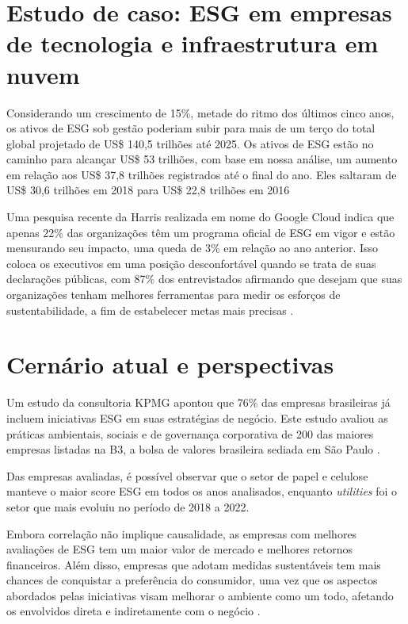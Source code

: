 \documentclass[12pt]{article}
\begin{document}
	\section*{Estudo de caso: ESG em empresas de tecnologia e infraestrutura em nuvem}
	
	Considerando um crescimento de 15\%, metade do ritmo dos últimos cinco anos, os ativos de ESG sob gestão poderiam subir para mais de um terço do total global projetado de US\$ 140,5 trilhões até 2025. Os ativos de ESG estão no caminho para alcançar US\$ 53 trilhões, com base em nossa análise, um aumento em relação aos US\$ 37,8 trilhões registrados até o final do ano. Eles saltaram de US\$ 30,6 trilhões em 2018 para US\$ 22,8 trilhões em 2016 \cite{bloombergprofessionalservicesESGAssetsMay2021}
	
	Uma pesquisa recente da Harris realizada em nome do Google Cloud indica que apenas 22\% das organizações têm um programa oficial de ESG em vigor e estão mensurando seu impacto, uma queda de 3\% em relação ao ano anterior. Isso coloca os executivos em uma posição desconfortável quando se trata de suas declarações públicas, com 87\% dos entrevistados afirmando que desejam que suas organizações tenham melhores ferramentas para medir os esforços de sustentabilidade, a fim de estabelecer metas mais precisas \cite{googlecloudUnderstandingHowYour2023}.
	
	\section*{Cernário atual e perspectivas}
	
	Um estudo da consultoria KPMG apontou que 76\% das empresas brasileiras já incluem iniciativas ESG em suas estratégias de negócio. Este estudo avaliou as práticas ambientais, sociais e de governança corporativa de 200 das maiores empresas listadas na B3, a bolsa de valores brasileira sediada em São Paulo \cite{deKPMGESGYearbook2023}.
	
	Das empresas avaliadas, é possível observar que o setor de papel e celulose manteve o maior score ESG em todos os anos analisados, enquanto \emph{utilities} foi o setor que mais evoluiu no período de 2018 a 2022.
	

	
	Embora correlação não implique causalidade, as empresas com melhores avaliações de ESG tem um maior valor de mercado e melhores retornos financeiros. Além disso, empresas que adotam medidas sustentáveis tem mais chances de conquistar a preferência do consumidor, uma vez que os aspectos abordados pelas iniciativas visam melhorar o ambiente como um todo, afetando os envolvidos direta e indiretamente com o negócio \cite{cabralPraticasESGAplicadas2023}.
	
\end{document}
